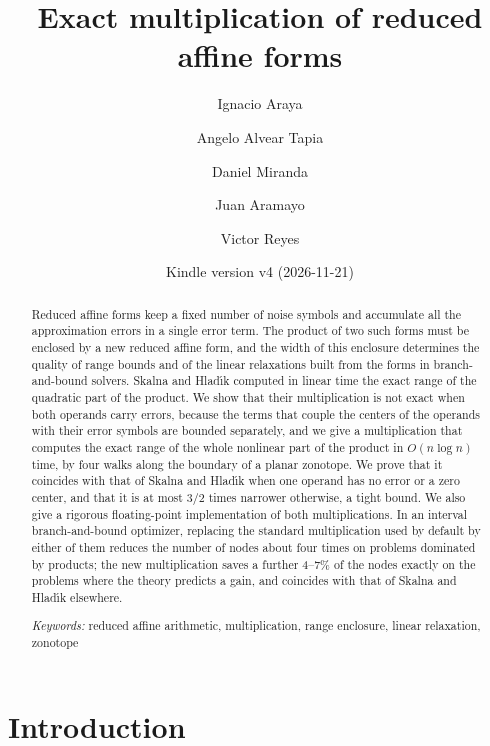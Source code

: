 \documentclass[10pt]{article}
\title{Exact multiplication of reduced affine forms}
\author{Ignacio Araya \and Angelo Alvear Tapia \and Daniel Miranda \and Juan Aramayo \and Victor Reyes}
\date{\small Kindle version v4 (2026-11-21)}
\theoremstyle{definition}
\begin{document}
\maketitle

\begin{abstract}
Reduced affine forms keep a fixed number of noise symbols and accumulate all the approximation errors in a single error term. The product of two such forms must be enclosed by a new reduced affine form, and the width of this enclosure determines the quality of range bounds and of the linear relaxations built from the forms in branch-and-bound solvers. Skalna and Hlad\'{\i}k computed in linear time the exact range of the quadratic part of the product. We show that their multiplication is not exact when both operands carry errors, because the terms that couple the centers of the operands with their error symbols are bounded separately, and we give a multiplication that computes the exact range of the whole nonlinear part of the product in $O(n\log n)$ time, by four walks along the boundary of a planar zonotope. We prove that it coincides with that of Skalna and Hlad\'{\i}k when one operand has no error or a zero center, and that it is at most $3/2$ times narrower otherwise, a tight bound. We also give a rigorous floating-point implementation of both multiplications. In an interval branch-and-bound optimizer, replacing the standard multiplication used by default by either of them reduces the number of nodes about four times on problems dominated by products; the new multiplication saves a further 4--7\% of the nodes exactly on the problems where the theory predicts a gain, and coincides with that of Skalna and Hlad\'{\i}k elsewhere.

\medskip\noindent
\textit{Keywords:} reduced affine arithmetic, multiplication, range enclosure, linear relaxation, zonotope
\end{abstract}

\section{Introduction}
\end{document}
